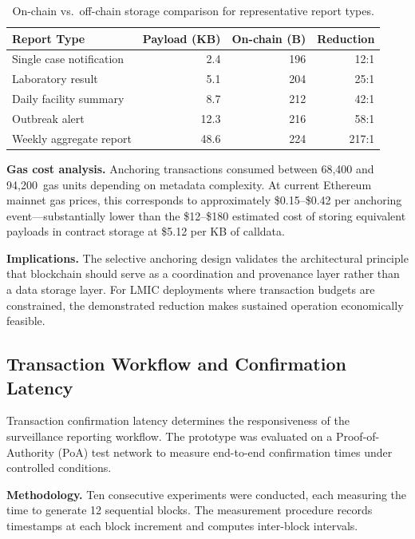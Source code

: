 \begin{table}[!ht]
\caption{On-chain vs.\ off-chain storage comparison for representative report types.}\label{tab:storage}
\centering
\small
\begin{tabular}{p{2.8cm}rrr}
\toprule
\textbf{Report Type} & \textbf{Payload (KB)} & \textbf{On-chain (B)} & \textbf{Reduction} \\
\midrule
Single case notification & 2.4 & 196 & 12:1 \\
Laboratory result & 5.1 & 204 & 25:1 \\
Daily facility summary & 8.7 & 212 & 42:1 \\
Outbreak alert & 12.3 & 216 & 58:1 \\
Weekly aggregate report & 48.6 & 224 & 217:1 \\
\bottomrule
\end{tabular}
\end{table}

\textbf{Gas cost analysis.} Anchoring transactions consumed between 68,400 and 94,200~gas units depending on metadata complexity. At current Ethereum mainnet gas prices, this corresponds to approximately \$0.15--\$0.42 per anchoring event---substantially lower than the \$12--\$180 estimated cost of storing equivalent payloads in contract storage at \$5.12 per KB of calldata.

\textbf{Implications.} The selective anchoring design validates the architectural principle that blockchain should serve as a coordination and provenance layer rather than a data storage layer. For LMIC deployments where transaction budgets are constrained, the demonstrated reduction makes sustained operation economically feasible.

\subsection{Transaction Workflow and Confirmation Latency}\label{subsec:latency_eval}

Transaction confirmation latency determines the responsiveness of the surveillance reporting workflow. The prototype was evaluated on a Proof-of-Authority (PoA) test network to measure end-to-end confirmation times under controlled conditions.

\textbf{Methodology.} Ten consecutive experiments were conducted, each measuring the time to generate 12 sequential blocks. The measurement procedure records timestamps at each block increment and computes inter-block intervals.

